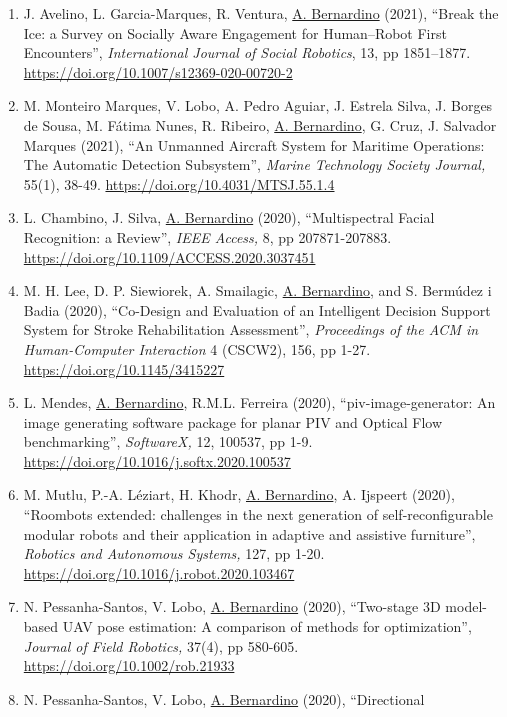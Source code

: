 \documentclass[
]{article}
\begin{document}
\begin{enumerate}
  \emph{Journal of Intelligent \& Robotic Systems,} 102, 52, pp 1-24.
  \url{https://doi.org/10.1007/s10846-021-01409-y}
\item
  J. Avelino, L. Garcia-Marques, R. Ventura, \ul{A. Bernardino} (2021),
  ``Break the Ice: a Survey on Socially Aware Engagement for
  Human--Robot First Encounters'', \emph{International Journal of Social
  Robotics}, 13, pp 1851--1877.
  \url{https://doi.org/10.1007/s12369-020-00720-2}~
\item
  M. Monteiro Marques, V. Lobo, A. Pedro Aguiar, J. Estrela Silva, J.
  Borges de Sousa, M. Fátima Nunes, R. Ribeiro, \ul{A. Bernardino}, G.
  Cruz, J. Salvador Marques (2021), ``An Unmanned Aircraft System for
  Maritime Operations: The Automatic Detection Subsystem'', \emph{Marine
  Technology Society Journal,} 55(1), 38-49.
  \url{https://doi.org/10.4031/MTSJ.55.1.4}~
\item
  L. Chambino, J. Silva, \ul{A. Bernardino} (2020), ``Multispectral
  Facial Recognition: a Review'', \emph{IEEE Access,} 8, pp
  207871-207883. \url{https://doi.org/10.1109/ACCESS.2020.3037451}~
\item
  M. H. Lee, D. P. Siewiorek, A. Smailagic, \ul{A. Bernardino}, and S.
  Bermúdez i Badia (2020), ``Co-Design and Evaluation of an Intelligent
  Decision Support System for Stroke Rehabilitation Assessment'',
  \emph{Proceedings of the ACM in Human-Computer Interaction} 4 (CSCW2),
  156, pp 1-27. \url{https://doi.org/10.1145/3415227}~
\item
  L. Mendes, \ul{A. Bernardino}, R.M.L. Ferreira (2020),
  ``piv-image-generator: An image generating software package for planar
  PIV and Optical Flow benchmarking'', \emph{SoftwareX,} 12, 100537, pp
  1-9. \url{https://doi.org/10.1016/j.softx.2020.100537}~
\item
  M. Mutlu, P.-A. Léziart, H. Khodr, \ul{A. Bernardino}, A. Ijspeert
  (2020), ``Roombots extended: challenges in the next generation of
  self-reconfigurable modular robots and their application in adaptive
  and assistive furniture'', \emph{Robotics and Autonomous Systems,}
  127, pp 1-20. \url{https://doi.org/10.1016/j.robot.2020.103467}~
\item
  N. Pessanha-Santos, V. Lobo, \ul{A. Bernardino} (2020), ``Two-stage 3D
  model-based UAV pose estimation: A comparison of methods for
  optimization'', \emph{Journal of Field Robotics,} 37(4), pp 580-605.
  \url{https://doi.org/10.1002/rob.21933}~
\item
  N. Pessanha-Santos, V. Lobo, \ul{A. Bernardino} (2020), ``Directional

\end{enumerate}
\end{document}
